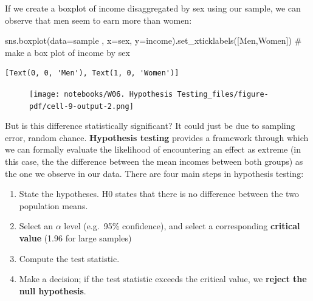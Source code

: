 \documentclass[
  letterpaper,
  DIV=11,
  numbers=noendperiod]{scrreprt}
\newenvironment{Shaded}{\begin{snugshade}}{\end{snugshade}}
\newcommand{\CommentTok}[1]{\textcolor[rgb]{0.37,0.37,0.37}{#1}}
\newcommand{\NormalTok}[1]{\textcolor[rgb]{0.00,0.23,0.31}{#1}}
\newcommand{\OperatorTok}[1]{\textcolor[rgb]{0.37,0.37,0.37}{#1}}
\newcommand{\StringTok}[1]{\textcolor[rgb]{0.13,0.47,0.30}{#1}}
\providecommand{\tightlist}{%
  \setlength{\itemsep}{0pt}\setlength{\parskip}{0pt}}\usepackage{longtable,booktabs,array}
\begin{document}
If we create a boxplot of income disaggregated by sex using our sample,
we can observe that men seem to earn more than women:

\begin{Shaded}
\begin{Highlighting}[]
\NormalTok{sns.boxplot(data}\OperatorTok{=}\NormalTok{sample , x}\OperatorTok{=}\StringTok{\textquotesingle{}sex\textquotesingle{}}\NormalTok{, y}\OperatorTok{=}\StringTok{\textquotesingle{}income\textquotesingle{}}\NormalTok{).set\_xticklabels([}\StringTok{\textquotesingle{}Men\textquotesingle{}}\NormalTok{,}\StringTok{\textquotesingle{}Women\textquotesingle{}}\NormalTok{]) }\CommentTok{\# make a box plot of income by sex}
\end{Highlighting}
\end{Shaded}

\begin{verbatim}
[Text(0, 0, 'Men'), Text(1, 0, 'Women')]
\end{verbatim}

\begin{figure}[H]

{\centering \texttt{[image: notebooks/W06. Hypothesis Testing\_files/figure-pdf/cell-9-output-2.png]}

}

\end{figure}

But is this difference statistically significant? It could just be due
to sampling error, random chance. \textbf{Hypothesis testing} provides a
framework through which we can formally evaluate the likelihood of
encountering an effect as extreme (in this case, the the difference
between the mean incomes between both groups) as the one we observe in
our data. There are four main steps in hypothesis testing:

\begin{enumerate}
\def\labelenumi{\arabic{enumi}.}
\tightlist
\item
  State the hypotheses. H0 states that there is no difference between
  the two population means.
\item
  Select an \(\alpha\) level (e.g.~95\% confidence), and select a
  corresponding \textbf{critical value} (1.96 for large samples)
\item
  Compute the test statistic.
\item
  Make a decision; if the test statistic exceeds the critical value, we
  \textbf{reject the null hypothesis}.
\end{enumerate}
\end{document}

